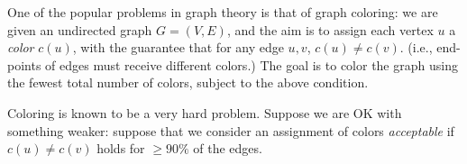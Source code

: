 \documentclass[addpoints]{exam}
\begin{document}
\begin{questions}

One of the popular problems in graph theory is that of graph coloring: we are given an undirected graph $G = (V, E)$, and the aim is to assign each vertex $u$ a {\em color} $c(u)$, with the guarantee that for any edge $u, v$, $c(u) \ne c(v)$.  (i.e., end-points of edges must receive different colors.) The goal is to color the graph using the fewest total number of colors, subject to the above condition.

Coloring is known to be a very hard problem. Suppose we are OK with something weaker: suppose that we consider an assignment of colors {\em acceptable} if $c(u) \ne c(v)$ holds for $\ge 90\%$ of the edges.


\begin{parts}


\end{parts}
\end{questions}
\end{document}
